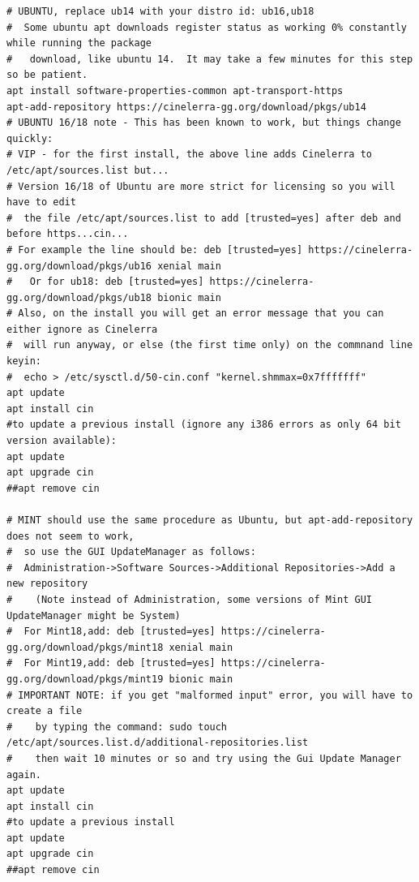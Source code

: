 \begin{lstlisting}[numbers=none]
# UBUNTU, replace ub14 with your distro id: ub16,ub18
#  Some ubuntu apt downloads register status as working 0% constantly while running the package
#   download, like ubuntu 14.  It may take a few minutes for this step so be patient.
apt install software-properties-common apt-transport-https
apt-add-repository https://cinelerra-gg.org/download/pkgs/ub14
# UBUNTU 16/18 note - This has been known to work, but things change quickly:
# VIP - for the first install, the above line adds Cinelerra to /etc/apt/sources.list but...
# Version 16/18 of Ubuntu are more strict for licensing so you will have to edit
#  the file /etc/apt/sources.list to add [trusted=yes] after deb and before https...cin...
# For example the line should be: deb [trusted=yes] https://cinelerra-gg.org/download/pkgs/ub16 xenial main
#   Or for ub18: deb [trusted=yes] https://cinelerra-gg.org/download/pkgs/ub18 bionic main
# Also, on the install you will get an error message that you can either ignore as Cinelerra
#  will run anyway, or else (the first time only) on the commnand line keyin: 
#  echo > /etc/sysctl.d/50-cin.conf "kernel.shmmax=0x7fffffff"
apt update
apt install cin
#to update a previous install (ignore any i386 errors as only 64 bit version available):
apt update
apt upgrade cin
##apt remove cin

# MINT should use the same procedure as Ubuntu, but apt-add-repository does not seem to work,
#  so use the GUI UpdateManager as follows:
#  Administration->Software Sources->Additional Repositories->Add a new repository
#    (Note instead of Administration, some versions of Mint GUI UpdateManager might be System)
#  For Mint18,add: deb [trusted=yes] https://cinelerra-gg.org/download/pkgs/mint18 xenial main
#  For Mint19,add: deb [trusted=yes] https://cinelerra-gg.org/download/pkgs/mint19 bionic main
# IMPORTANT NOTE: if you get "malformed input" error, you will have to create a file
#    by typing the command: sudo touch /etc/apt/sources.list.d/additional-repositories.list
#    then wait 10 minutes or so and try using the Gui Update Manager again.
apt update
apt install cin
#to update a previous install
apt update
apt upgrade cin
##apt remove cin


\end{lstlisting}
